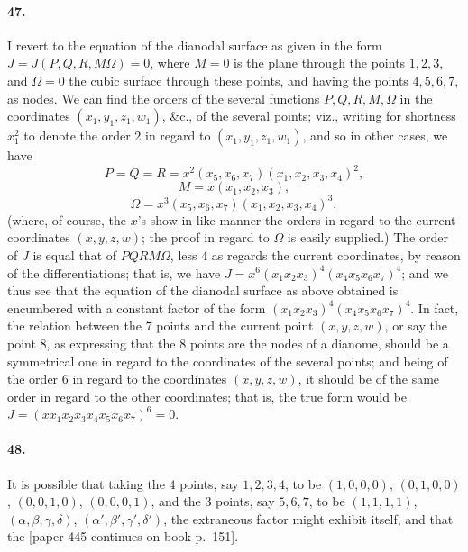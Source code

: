 \documentclass[11pt,a4paper]{article}
\begin{document}
\paragraph{47.}
I revert to the equation of the dianodal surface as given in the form
$J = J(P, Q, R, M \Omega) = 0$, where $M = 0$ is the plane through the points $1, 2, 3$,
and $\Omega = 0$ the cubic surface through these points, and having the points $4, 5, 6, 7$,
as nodes. We can find the orders of the several functions $P, Q, R, M, \Omega$ in the
coordinates $(x_1, y_1, z_1, w_1)$, \&c., of the several points; viz., writing for shortness
$x_1^2$ to denote the order $2$ in regard to $(x_1, y_1, z_1, w_1)$, and so in other cases,
we have
\[
P = Q = R = x^2(x_5, x_6, x_7)(x_1, x_2, x_3, x_4)^2,
\]
\[
M = x(x_1, x_2, x_3),
\]
\[
\Omega = x^3(x_5, x_6, x_7)(x_1, x_2, x_3, x_4)^3,
\]
(where, of course, the $x$'s show in like manner the orders in regard to the current
coordinates $(x, y, z, w)$; the proof in regard to $\Omega$ is easily supplied.) The order
of $J$ is equal that of $P Q R M \Omega$, less $4$ as regards the current coordinates, by
reason of the differentiations; that is, we have $J = x^6 (x_1 x_2 x_3)^4 (x_4 x_5 x_6 x_7)^4$;
and we thus see that the equation of the dianodal surface as above obtained is encumbered
with a constant factor of the form $(x_1 x_2 x_3)^4 (x_4 x_5 x_6 x_7)^4$. In fact, the
relation between the $7$ points and the current point $(x, y, z, w)$, or say the point $8$,
as expressing that the $8$ points are the nodes of a dianome, should be a symmetrical one
in regard to the coordinates of the several points; and being of the order $6$ in regard to
the coordinates $(x, y, z, w)$, it should be of the same order in regard to the other
coordinates; that is, the true form would be $J = (x x_1 x_2 x_3 x_4 x_5 x_6 x_7)^6 = 0$.

\paragraph{48.}
It is possible that taking the $4$ points, say $1, 2, 3, 4$, to be $(1, 0, 0, 0)$,
$(0, 1, 0, 0)$, $(0, 0, 1, 0)$, $(0, 0, 0, 1)$, and the $3$ points, say $5, 6, 7$, to be
$(1, 1, 1, 1)$, $(\alpha, \beta, \gamma, \delta)$, $(\alpha', \beta', \gamma', \delta')$,
the extraneous factor might exhibit itself, and that the [paper 445 continues on book p.\ 151].
\end{document}
